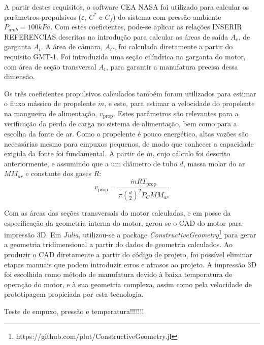 A partir destes requisitos, o software CEA NASA foi utilizado para calcular os parâmetros propulsivos (\(\varepsilon \), \(C^\ast \) e \(C_f\)) do sistema com pressão ambiente \(P_{amb} = 100kPa\). Com estes coeficientes, pode-se aplicar as relações INSERIR REFERENCIAS descritas na introdução para calcular as áreas de saída \(A_e\), de garganta \(A_t\). A área de câmara, \(A_C\), foi calculada diretamente a partir do requisito GMT-1. Foi introduzida uma seção cilíndrica na garganta do motor, com área de seção transversal \(A_t\), para garantir a manufatura precisa dessa dimensão.

Os três coeficientes propulsivos calculados também foram utilizados para estimar o fluxo mássico de propelente \(\dot{m}\), e este, para estimar a velocidade do propelente na mangueira de alimentação, \(v_{\text{prop}}\). Estes parâmetros são relevantes para a verificação da perda de carga no sistema de alimentação, bem como para a escolha da fonte de ar. Como o propelente é pouco energético, altas vazões são necessárias mesmo para empuxos pequenos, de modo que conhecer a capacidade exigida da fonte foi fundamental. A partir de \(\dot{m}\), cujo cálculo foi descrito anteriormente, e assumindo que a  um diâmetro de tubo \(d\), massa molar do ar \(MM_{ar}\) e constante dos gases \(R\):
\begin{equation}
    v_{\text{prop}} = \frac{\dot{m} R T_{\text{prop}}}{\pi \left(\frac{d}{2}\right)^2 P_C MM_{ar}}
\end{equation}

Com as áreas das seções transversais do motor calculadas, e em posse da especificação da geometria interna do motor, gerou-se o CAD do motor para impressão 3D. Em \textit{Julia}, utilizou-se a package \textit{ConstructiveGeometry}\footnote[1]{https://github.com/plut/ConstructiveGeometry.jl} para gerar a geometria tridimensional a partir do dados de geometria calculados. Ao produzir o CAD diretamente a partir do código de projeto, foi possível eliminar etapas manuais que podem introduzir erros e atrasos ao projeto. A impressão 3D foi escolhida como método de manufatura devido à baixa temperatura de operação do motor, e à sua geometria complexa, assim como pela velocidade de prototipagem propiciada por esta tecnologia.

Teste de empuxo, pressão e temperatura!!!!!!!